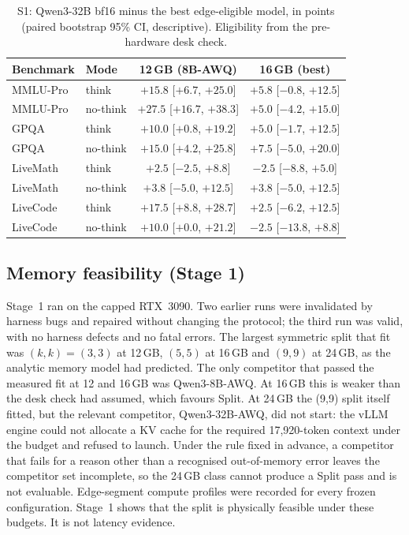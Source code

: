 \documentclass[lettersize,journal]{IEEEtran}
\begin{document}
\begin{table}[t]
\centering
\caption{S1: Qwen3-32B bf16 minus the best edge-eligible model, in points (paired bootstrap 95\% CI, descriptive). Eligibility from the pre-hardware desk check.}
\label{tab:s1}
\footnotesize
\setlength{\tabcolsep}{3pt}
\begin{tabular}{@{}llcc@{}}
\toprule
Benchmark & Mode & 12\,GB (8B-AWQ) & 16\,GB (best) \\
\midrule
MMLU-Pro & think & $+15.8$ [$+6.7$, $+25.0$] & $+5.8$ [$-0.8$, $+12.5$] \\
MMLU-Pro & no-think & $+27.5$ [$+16.7$, $+38.3$] & $+5.0$ [$-4.2$, $+15.0$] \\
GPQA & think & $+10.0$ [$+0.8$, $+19.2$] & $+5.0$ [$-1.7$, $+12.5$] \\
GPQA & no-think & $+15.0$ [$+4.2$, $+25.8$] & $+7.5$ [$-5.0$, $+20.0$] \\
LiveMath & think & $+2.5$ [$-2.5$, $+8.8$] & $-2.5$ [$-8.8$, $+5.0$] \\
LiveMath & no-think & $+3.8$ [$-5.0$, $+12.5$] & $+3.8$ [$-5.0$, $+12.5$] \\
LiveCode & think & $+17.5$ [$+8.8$, $+28.7$] & $+2.5$ [$-6.2$, $+12.5$] \\
LiveCode & no-think & $+10.0$ [$+0.0$, $+21.2$] & $-2.5$ [$-13.8$, $+8.8$] \\
\bottomrule
\end{tabular}
\end{table}

\subsection{Memory feasibility (Stage 1)}
Stage~1 ran on the capped RTX~3090. Two earlier runs were invalidated by harness bugs and repaired without changing the protocol; the third run was valid, with no harness defects and no fatal errors. The largest symmetric split that fit was $(k,k)=(3,3)$ at 12\,GB, $(5,5)$ at 16\,GB and $(9,9)$ at 24\,GB, as the analytic memory model had predicted. The only competitor that passed the measured fit at 12 and 16\,GB was Qwen3-8B-AWQ. At 16\,GB this is weaker than the desk check had assumed, which favours Split. At 24\,GB the (9,9) split itself fitted, but the relevant competitor, Qwen3-32B-AWQ, did not start: the vLLM engine could not allocate a KV cache for the required 17,920-token context under the budget and refused to launch. Under the rule fixed in advance, a competitor that fails for a reason other than a recognised out-of-memory error leaves the competitor set incomplete, so the 24\,GB class cannot produce a Split pass and is not evaluable. Edge-segment compute profiles were recorded for every frozen configuration. Stage~1 shows that the split is physically feasible under these budgets. It is not latency evidence.
\end{document}
